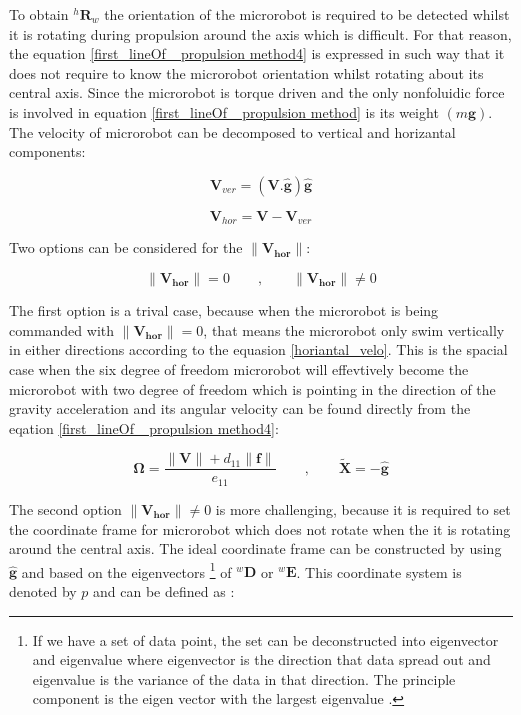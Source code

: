\documentclass[12pt,a4paper,titlepage]{report}
\begin{document}
 To obtain ${^{h}\bm{R}_w}$ the orientation of the microrobot is required to be detected 
whilst it is rotating during propulsion around the axis which is difficult. For that reason, the equation
\ref{first_lineOf_ propulsion method4} is expressed in such way that it does not require to know the
microrobot orientation whilst rotating about its central axis. Since the microrobot is torque driven and the only 
nonfoluidic force is involved in equation \ref{first_lineOf_ propulsion method} is its weight $(m \bm{g})$. The 
velocity of microrobot can be decomposed to vertical and horizantal components:

 \begin{equation}
\bm{V}_{ver} = (\bm{V . \hat{g}})\bm{\hat {g}}
\label{vertical_velo}
\end{equation}


\begin{equation}
\bm{V}_{hor} = \bm{V} - \bm{V}_{ver}  
\label{horiantal_velo}
\end{equation}

Two options can be considered for the ${\| \bm {{V}_{hor}}\|}$:


\begin{equation}
 {\| \bm {{V}_{hor}}\|}  = 0 \qquad ,  \qquad  {\| \bm{{V}_{hor}}\|} \neq 0
\label{total_force_torque}
\end{equation}

The first option is a trival case, because when the microrobot is being commanded with
$ {\| \bm {{V}_{hor}}\|}  = 0$, that means the microrobot only swim vertically in either 
directions according to the equasion \ref{horiantal_velo}. This is the spacial case when the six degree of
freedom microrobot will effevtively become the microrobot with two degree of freedom which is pointing
in the direction of the gravity acceleration and its angular velocity can be found directly from the eqation
\ref{first_lineOf_ propulsion method4}:


\begin{equation}
 \bm {\Omega}  = \frac{{\| \bm{V}\|}+ d_{11}\| \bm{f}\|}{e_{11}}  \qquad ,  \qquad  \tilde{\bm{X}} = -\hat{\bm{g}}
\label{angular_velo_horiVelo=0}
\end{equation}

The second option ${\| \bm{{V}_{hor}}\|} \neq 0$ is more challenging, because it is required to set 
the coordinate frame for microrobot which does not rotate when the it is rotating around the central axis.
The ideal coordinate frame can be constructed by using $\hat{\bm{g}}$ and based on the eigenvectors
\footnote{If we have a set of data point, the set can be deconstructed into eigenvector and eigenvalue
where eigenvector is the direction that data spread out and eigenvalue is the variance of the data in that
direction. The principle component is the eigen vector with the largest eigenvalue \citep{Doe:2013Oct:Online}.} of 
$^{w}\bm{D}$ or $^{w}\bm{E}$. This coordinate system is denoted by $p$ and can be defined as :
\end{document}
